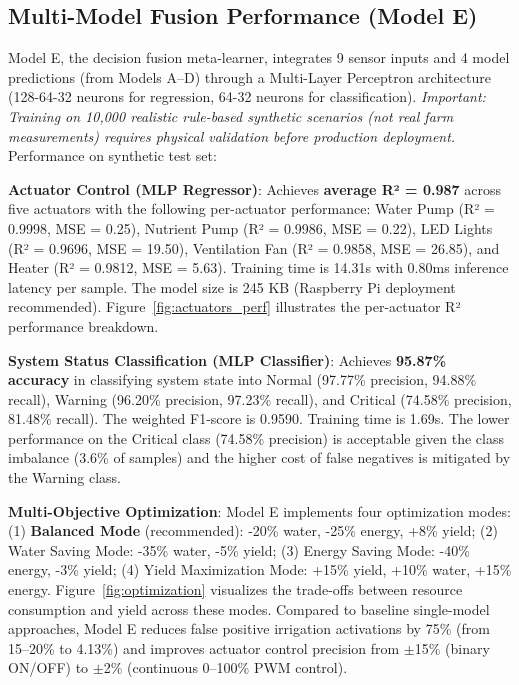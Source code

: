 \documentclass[conference]{IEEEtran}
\begin{document}
\subsection{Multi-Model Fusion Performance (Model E)}

Model E, the decision fusion meta-learner, integrates 9 sensor inputs and 4 model predictions (from Models A--D) through a Multi-Layer Perceptron architecture (128-64-32 neurons for regression, 64-32 neurons for classification). \textit{Important: Training on 10,000 realistic rule-based synthetic scenarios (not real farm measurements) requires physical validation before production deployment.} Performance on synthetic test set:

\textbf{Actuator Control (MLP Regressor)}: Achieves \textbf{average R² = 0.987} across five actuators with the following per-actuator performance: Water Pump (R² = 0.9998, MSE = 0.25), Nutrient Pump (R² = 0.9986, MSE = 0.22), LED Lights (R² = 0.9696, MSE = 19.50), Ventilation Fan (R² = 0.9858, MSE = 26.85), and Heater (R² = 0.9812, MSE = 5.63). Training time is 14.31s with 0.80ms inference latency per sample. The model size is 245 KB (Raspberry Pi deployment recommended). Figure~\ref{fig:actuators_perf} illustrates the per-actuator R² performance breakdown.

\textbf{System Status Classification (MLP Classifier)}: Achieves \textbf{95.87\% accuracy} in classifying system state into Normal (97.77\% precision, 94.88\% recall), Warning (96.20\% precision, 97.23\% recall), and Critical (74.58\% precision, 81.48\% recall). The weighted F1-score is 0.9590. Training time is 1.69s. The lower performance on the Critical class (74.58\% precision) is acceptable given the class imbalance (3.6\% of samples) and the higher cost of false negatives is mitigated by the Warning class.

\textbf{Multi-Objective Optimization}: Model E implements four optimization modes: (1) \textbf{Balanced Mode} (recommended): -20\% water, -25\% energy, +8\% yield; (2) Water Saving Mode: -35\% water, -5\% yield; (3) Energy Saving Mode: -40\% energy, -3\% yield; (4) Yield Maximization Mode: +15\% yield, +10\% water, +15\% energy. Figure~\ref{fig:optimization} visualizes the trade-offs between resource consumption and yield across these modes. Compared to baseline single-model approaches, Model E reduces false positive irrigation activations by 75\% (from 15--20\% to 4.13\%) and improves actuator control precision from $\pm$15\% (binary ON/OFF) to $\pm$2\% (continuous 0--100\% PWM control).
\end{document}
